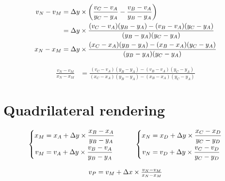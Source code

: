 \begin{align*}
v_N - v_M & = \Delta y \times \left(\frac{v_C - v_A}{y_C - y_A} - \frac{v_B - v_A}{y_B - y_A}\right) \\
& = \Delta y \times \frac{(v_C - v_A)(y_B - y_A) - (v_B - v_A)(y_C - y_A)}{(y_B - y_A)(y_C - y_A)}
\\
x_N - x_M & = \Delta y \times \frac{(x_C - x_A)(y_B - y_A) - (x_B - x_A)(y_C - y_A)}{(y_B - y_A)(y_C - y_A)}
\end{align*}

\begin{align*}
\frac{v_N - v_M}{x_N - x_M} & = \frac{(v_C - v_A)(y_B - y_A) - (v_B - v_A)(y_C - y_A)}{(x_C - x_A)(y_B - y_A) - (x_B - x_A)(y_C - y_A)}
\end{align*}

\section{Quadrilateral rendering}


\begin{displaymath}
  \begin{array}{c}
    \begin{array}{c@{\quad\quad\quad}c}
      \left\{
        \begin{aligned}
          x_M & = x_A + \dy \times \frac{x_B - x_A}{y_B - y_A} \\
          v_M & = v_A + \dy \times \frac{v_B - v_A}{y_B - y_A} 
        \end{aligned}
      \right.
      &
      \left\{
        \begin{aligned}
          x_N & = x_D + \dy \times \frac{x_C - x_D}{y_C - y_D} \\
          v_N & = v_D + \dy \times \frac{v_C - v_D}{y_C - y_D} \\
        \end{aligned}
      \right.
    \end{array}
    \\
    \\
    v_P = v_M + \dx \times \frac{v_N - v_M}{x_N - x_M}
  \end{array}
\end{displaymath}

